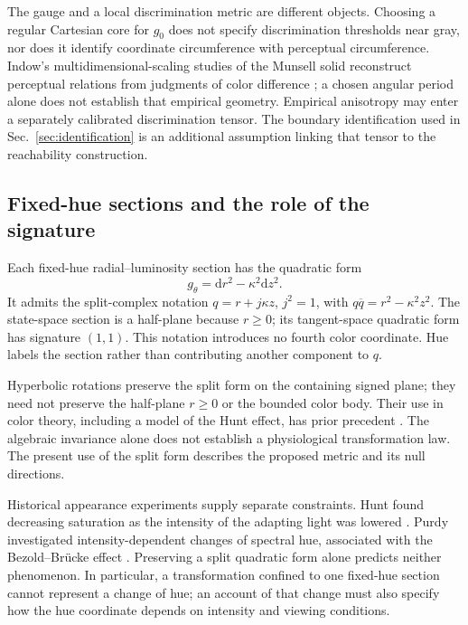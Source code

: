 \documentclass[11pt,letterpaper]{article}
\theoremstyle{plain}
\newcommand{\dd}{\mathrm{d}}
\begin{document}
The gauge and a local discrimination metric are different objects. Choosing a regular Cartesian core for $g_0$ does not specify discrimination thresholds near gray, nor does it identify coordinate circumference with perceptual circumference. Indow's multidimensional-scaling studies of the Munsell solid reconstruct perceptual relations from judgments of color difference \cite{Indow1988}; a chosen angular period alone does not establish that empirical geometry. Empirical anisotropy may enter a separately calibrated discrimination tensor. The boundary identification used in Sec.~\ref{sec:identification} is an additional assumption linking that tensor to the reachability construction.

\subsection{Fixed-hue sections and the role of the signature}
Each fixed-hue radial--luminosity section has the quadratic form
\begin{equation}
 g_\theta=\dd r^2-\kappa^2\dd z^2.
 \label{eq:section-metric}
\end{equation}
It admits the split-complex notation $q=r+j\kappa z$, $j^2=1$, with $q\overline q=r^2-\kappa^2z^2$. The state-space section is a half-plane because $r\geq0$; its tangent-space quadratic form has signature $(1,1)$. This notation introduces no fourth color coordinate. Hue labels the section rather than contributing another component to $q$.

Hyperbolic rotations preserve the split form on the containing signed plane; they need not preserve the half-plane $r\geq0$ or the bounded color body. Their use in color theory, including a model of the Hunt effect, has prior precedent \cite{BerthierProvenzi2022}. The algebraic invariance alone does not establish a physiological transformation law. The present use of the split form describes the proposed metric and its null directions.

Historical appearance experiments supply separate constraints. Hunt found decreasing saturation as the intensity of the adapting light was lowered \cite{Hunt1952}. Purdy investigated intensity-dependent changes of spectral hue, associated with the Bezold--Br\"ucke effect \cite{Purdy1931}. Preserving a split quadratic form alone predicts neither phenomenon. In particular, a transformation confined to one fixed-hue section cannot represent a change of hue; an account of that change must also specify how the hue coordinate depends on intensity and viewing conditions.
\end{document}
